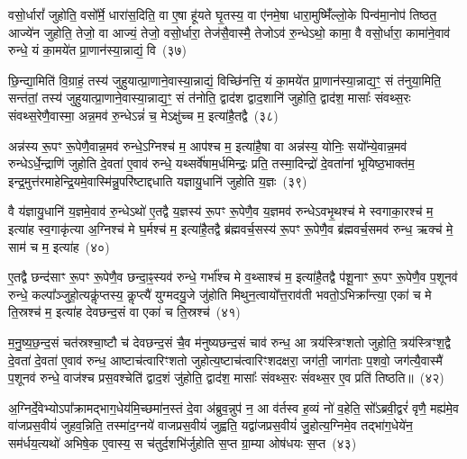 {\anuvakamend[{अग्ने॒ प्रेह्यव॑ स्म दुहे॒ तां प्र॒जा\-प॑तेः सा॒क्षान्म॑नुष्यवि॒शमेक॑विꣳशतिश्च}]}%

वसो॒र्धारां᳚ जुहोति॒ वसो᳚र्मे॒ धारा॑स॒दिति॒ वा ए॒षा हू॑यते घृ॒तस्य॒ वा ए॑नमे॒षा धारा॒मुष्मिँ॑ल्लो॒के पिन्व॑मा॒नोप॑ तिष्ठत॒ आज्ये॑न जुहोति॒ तेजो॒ वा आज्यं॒ तेजो॒ वसो॒र्धारा॒ तेज॑सै॒वास्मै॒ तेजो\-ऽव॑ रु॒न्धे\-ऽथो॒ कामा॒ वै वसो॒र्धारा॒ कामा॑ने॒वाव॑ रुन्धे॒ यं का॒मये॑त प्रा॒णान॑स्या॒न्नाद्यं॒ वि~(३७)

छि॒न्द्या॒मिति॑ वि॒ग्राहं॒ तस्य॑ जुहुयात्प्रा॒णाने॒वास्या॒न्नाद्यं॒ विच्छि॑नत्ति॒ यं का॒मये॑त प्रा॒णान॑स्या॒न्नाद्य॒ꣳ॒ सं त॑नुया॒मिति॒ सन्त॑तां॒ तस्य॑ जुहुयात्प्रा॒णाने॒वास्या॒न्नाद्य॒ꣳ॒ सं त॑नोति॒ द्वाद॑श द्वाद॒शानि॑ जुहोति॒ द्वाद॑श॒ मासाः᳚ संवथ्स॒रः संवथ्स॒रेणै॒वास्मा॒ अन्न॒मव॑ रु॒न्धे\-ऽन्नं॑ च॒ मे\-ऽक्षु॑च्च म॒ इत्या॑है॒तद्वै~(३८)

अन्न॑स्य रू॒पꣳ रू॒पेणै॒वान्न॒मव॑ रुन्धे॒\-ऽग्निश्च॑ म॒ आप॑श्च म॒ इत्या॑है॒षा वा अन्न॑स्य॒ योनिः॒ सयो᳚न्ये॒वान्न॒मव॑ रुन्धे\-ऽर्धे॒न्द्राणि॑ जुहोति दे॒वता॑ ए॒वाव॑ रुन्धे॒ यथ्सर्वे॑षाम॒र्धमिन्द्रः॒ प्रति॒ तस्मा॒दिन्द्रो॑ दे॒वता॑नां भूयिष्ठ॒भाक्त॑म॒ इन्द्र॒मुत्त॑रमाहेन्द्रि॒यमे॒वास्मि॑न्नु॒परि॑ष्टाद्दधाति यज्ञायु॒धानि॑ जुहोति य॒ज्ञः~(३९)

वै य॑ज्ञायु॒धानि॑ य॒ज्ञमे॒वाव॑ रु॒न्धे\-ऽथो॑ ए॒तद्वै य॒ज्ञस्य॑ रू॒पꣳ रू॒पेणै॒व य॒ज्ञमव॑ रुन्धे\-ऽवभृ॒थश्च॑ मे स्वगाका॒रश्च॑ म॒ इत्या॑ह स्व॒गाकृ॑त्या अ॒ग्निश्च॑ मे घ॒र्मश्च॑ म॒ इत्या॑है॒तद्वै ब्र॑ह्मवर्च॒सस्य॑ रू॒पꣳ रू॒पेणै॒व ब्र॑ह्मवर्च॒समव॑ रुन्ध॒ ऋक्च॑ मे॒ साम॑ च म॒ इत्या॑ह~(४०)

ए॒तद्वै छन्द॑साꣳ रू॒पꣳ रू॒पेणै॒व छन्दा॒ꣴ॒स्यव॑ रुन्धे॒ गर्भा᳚श्च मे व॒थ्साश्च॑ म॒ इत्या॑है॒तद्वै प॑शू॒नाꣳ रू॒पꣳ रू॒पेणै॒व प॒शूनव॑ रुन्धे॒ कल्पा᳚ञ्जुहो॒त्यकॢ॑प्तस्य॒ कॢप्त्यै॑ युग्मदयु॒जे जु॑होति मिथुन॒त्वायो᳚त्त॒राव॑ती भवतो॒\-ऽभिक्रा᳚न्त्या॒ एका॑ च मे ति॒स्रश्च॑ म॒ इत्या॑ह देवछन्द॒सं वा एका॑ च ति॒स्रश्च॑~(४१)

म॒नु॒ष्य॒छ॒न्द॒सं चत॑स्रश्चा॒ष्टौ च॑ देवछन्द॒सं चै॒व म॑नुष्यछन्द॒सं चाव॑ रुन्ध॒ आ त्रय॑स्त्रिꣳशतो जुहोति॒ त्रय॑स्त्रिꣳश॒द्वै दे॒वता॑ दे॒वता॑ ए॒वाव॑ रुन्ध॒ आष्टाच॑त्वारिꣳशतो जुहोत्य॒ष्टाच॑त्वारिꣳशद\-क्षरा॒ जग॑ती॒ जाग॑ताः प॒शवो॒ जग॑त्यै॒वास्मै॑ प॒शूनव॑ रुन्धे॒ वाज॑श्च प्रस॒वश्चेति॑ द्वाद॒शं जु॑होति॒ द्वाद॑श॒ मासाः᳚ संवथ्स॒रः सं॑वथ्स॒र ए॒व प्रति॑ तिष्ठति॥~(४२)

{\anuvakamend[{वि वै य॒ज्ञः साम॑ च म॒ इत्या॑ह च ति॒स्रश्चैका॒न्नप॑ञ्चा॒शच्च॑}]}%

अ॒ग्निर्दे॒वेभ्यो\-ऽपा᳚क्रामद्भाग॒धेय॑मि॒च्छमा॑न॒स्तं दे॒वा अ॑ब्रुव॒न्नुप॑ न॒ आ व॑र्तस्व ह॒व्यं नो॑ व॒हेति॒ सो᳚\-ऽब्रवी॒द्वरं॑ वृणै॒ मह्य॑मे॒व वा॑जप्रस॒वीयं॑ जुहव॒न्निति॒ तस्मा॑द॒ग्नये॑ वाजप्रस॒वीयं॑ जुह्वति॒ यद्वा॑जप्रस॒वीयं॑ जु॒होत्य॒ग्निमे॒व तद्भा॑ग॒धेये॑न॒ सम॑र्धय॒त्यथो॑ अभिषे॒क ए॒वास्य॒ स च॑तुर्द॒शभि॑र्जुहोति स॒प्त ग्रा॒म्या ओष॑धयः स॒प्त~(४३)

